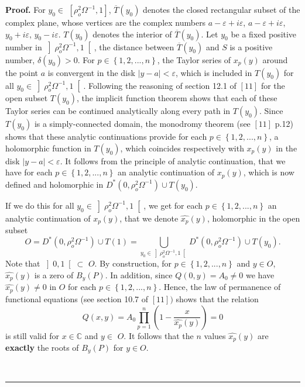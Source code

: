 \documentclass{article}
\newenvironment{proof}[1][Proof]{\textbf{#1.} }{\ \rule{0.5em}{0.5em}}
\begin{document}
\begin{proof}
For $y_{0}\in $ $\left[ \rho _{o}^{2}\Omega ^{-1},1\right] $, $\overline{T}\left( y_{0}\right) $ denotes the closed rectangular subset of the complex
plane, whose vertices are the complex numbers $a-\varepsilon +i\varepsilon $, $a-\varepsilon +i\varepsilon $, $y_{0}+i\varepsilon $, $y_{0}-i\varepsilon 
$. $T\left( y_{0}\right) $ denotes the interior of $\overline{T}\left(
y_{0}\right) $. Let $y_{0}$ be a fixed positive number in $\left] \rho
_{o}^{2}\Omega ^{-1},1\right[ $, the distance between $\overline{T}\left(
y_{0}\right) $ and $S$ is a positive number, $\delta \left( y_{0}\right) >0$. For $p\in \left\{ 1,2,...,n\right\} $, the Taylor series of $x_{p}\left(
y\right) $ around the point $a$ is convergent in the disk $\left| y-a\right|
<\varepsilon $, which is included in $T\left( y_{0}\right) $ for all $y_{0}\in \left] \rho _{o}^{2}\Omega ^{-1},1\right[ $. Following the
reasoning of section 12.1 of $\left[ 11\right] $ for the open subset $T\left( y_{0}\right) $, the implicit function theorem shows that each of
these Taylor series can be continued analytically along every path in $T\left( y_{0}\right) $. Since $T\left( y_{0}\right) $ is a simply-connected
domain, the monodromy theorem (see $\left[ 11\right] $ p.12) shows that
these analytic continuations provide for each $p\in \left\{
1,2,...,n\right\} $, a holomorphic function in $T\left( y_{0}\right) $,
which coincides respectively with $x_{p}\left( y\right) $ in the disk $\left| y-a\right| <\varepsilon .$ It follows from the principle of analytic
continuation, that we have for each $p\in \left\{ 1,2,...,n\right\} $ an
analytic continuation of $x_{p}\left( y\right) $, which is now defined and
holomorphic in $D^{\ast }\left( 0,\rho _{o}^{2}\Omega ^{-1}\right) \cup
T\left( y_{0}\right) .$

If we do this for all $y_{0}\in \left] \rho _{o}^{2}\Omega ^{-1},1\right[ $,
we get for each $p\in \left\{ 1,2,...,n\right\} $ an analytic continuation
of $x_{p}\left( y\right) $, that we denote $\widehat{x_{p}}\left( y\right) $, holomorphic in the open subset 
\begin{equation*}
O=D^{\ast }\left( 0,\rho _{o}^{2}\Omega ^{-1}\right) \cup T\left( 1\right)
=\bigcup_{y_{0}\in \left] \rho _{o}^{2}\Omega ^{-1},1\right[ }D^{\ast
}\left( 0,\rho _{o}^{2}\Omega ^{-1}\right) \cup T\left( y_{0}\right) \text{.}
\end{equation*}
Note that $\left] 0,1\right[ \subset $ $O$. By construction, for $p\in
\left\{ 1,2,...,n\right\} $ and $y\in O$, $\widehat{x_{p}}\left( y\right) $
is a zero of $B_{y}\left( P\right) $. In addition, since $Q\left( 0,y\right)
=A_{0}\neq 0$ we have $\widehat{x_{p}}\left( y\right) \neq 0$ in $O$ for
each $p\in \left\{ 1,2,...,n\right\} $. Hence, the law of permanence of
functional equations (see section 10.7 of $\left[ 11\right] )$ shows that
the relation 
\begin{equation*}
Q\left( x,y\right) =A_{0}\prod\limits_{p=1}^{n}\left( 1-\dfrac{x}{\widehat{x_{p}}\left( y\right) }\right) =0
\end{equation*}
is still valid for $x\in \mathbb{C}$ and $y\in $ $O$. It follows that the $n$
values $\widehat{x_{p}}\left( y\right) $ are \textbf{exactly} the roots of $B_{y}\left( P\right) $ for $y\in O$.


\end{proof}
\end{document}
